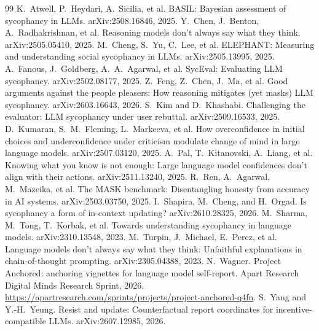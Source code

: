 \documentclass[11pt]{article}
\begin{document}
\begin{thebibliography}{99}\small
{} K.~Atwell, P.~Heydari, A.~Sicilia, et al. BASIL: Bayesian assessment of
sycophancy in LLMs. arXiv:2508.16846, 2025.
 Y.~Chen, J.~Benton, A.~Radhakrishnan, et al. Reasoning models don't always
say what they think. arXiv:2505.05410, 2025.
 M.~Cheng, S.~Yu, C.~Lee, et al. ELEPHANT: Measuring and understanding social
sycophancy in LLMs. arXiv:2505.13995, 2025.
 A.~Fanous, J.~Goldberg, A.~A.~Agarwal, et al. SycEval: Evaluating LLM
sycophancy. arXiv:2502.08177, 2025.
 Z.~Feng, Z.~Chen, J.~Ma, et al. Good arguments against the people pleasers: How
reasoning mitigates (yet masks) LLM sycophancy. arXiv:2603.16643, 2026.
 S.~Kim and D.~Khashabi. Challenging the evaluator: LLM sycophancy under user
rebuttal. arXiv:2509.16533, 2025.
 D.~Kumaran, S.~M.~Fleming, L.~Markeeva, et al. How overconfidence in
initial choices and underconfidence under criticism modulate change of mind in large language models.
arXiv:2507.03120, 2025.
 A.~Pal, T.~Kitanovski, A.~Liang, et al. Knowing what you know is not enough: Large
language model confidences don't align with their actions. arXiv:2511.13240, 2025.
 R.~Ren, A.~Agarwal, M.~Mazeika, et al. The MASK benchmark: Disentangling honesty
from accuracy in AI systems. arXiv:2503.03750, 2025.
 I.~Shapira, M.~Cheng, and H.~Orgad. Is sycophancy a form of in-context
updating? arXiv:2610.28325, 2026.
 M.~Sharma, M.~Tong, T.~Korbak, et al. Towards understanding sycophancy in
language models. arXiv:2310.13548, 2023.
 M.~Turpin, J.~Michael, E.~Perez, et al. Language models don't always say what
they think: Unfaithful explanations in chain-of-thought prompting. arXiv:2305.04388, 2023.
 N.~Wagner. Project Anchored: anchoring vignettes for language model self-report. Apart Research Digital Minds Research
Sprint, 2026. \url{https://apartresearch.com/sprints/projects/project-anchored-q4fn}.
 S.~Yang and Y.-H.~Yeung. Resist and update: Counterfactual report coordinates
for incentive-compatible LLMs. arXiv:2607.12985, 2026.
\end{thebibliography}
\end{document}
